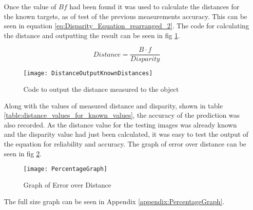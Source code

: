 \documentclass[conference]{IEEEtran}
\begin{document}
Once the value of $Bf$ had been found it was used to calculate the distances for the known targets, as of test of the previous measurements accuracy. This can be seen in equation \ref{eq:Disparity_Equation_rearranged_2}. The code for calculating the distance and outputting the result can be seen in fig \ref{fig:DistanceOutputKnownDistances}.

\begin{equation} \label{eq:Disparity_Equation_rearranged_2}
Distance = \frac{B \cdot f}{Disparity}
\end{equation}

\begin{figure}[H]
\centerline{\texttt{[image: DistanceOutputKnownDistances]}}
\caption{Code to output the distance measured to the object}
\label{fig:DistanceOutputKnownDistances}
\end{figure}

Along with the values of measured distance and disparity, shown in table \ref{table:distance_values_for_known_values}, the accuracy of the prediction was also recorded. As the distance value for the testing images was already known and the disparity value had just been calculated, it was easy to test the output of the equation for reliability and accuracy. The graph of error over distance can be seen in fig \ref{fig:PercentageGraph}.

\begin{figure}[H]
\centerline{\texttt{[image: PercentageGraph]}}
\caption{Graph of Error over Distance}
\label{fig:PercentageGraph}
\end{figure}

The full size graph can be seen in Appendix \ref{appendix:PercentageGraph}.
\end{document}
